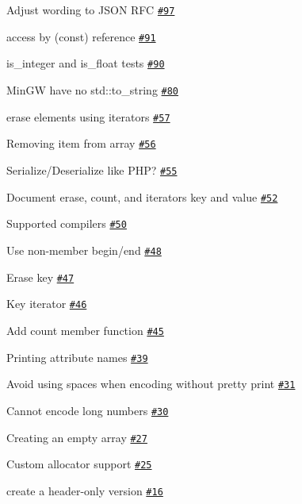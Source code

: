\begin{DoxyItemize}
\item Adjust wording to J\+S\+ON R\+FC \href{https://github.com/nlohmann/json/issues/97}{\tt \#97}
\item access by (const) reference \href{https://github.com/nlohmann/json/issues/91}{\tt \#91}
\item is\+\_\+integer and is\+\_\+float tests \href{https://github.com/nlohmann/json/issues/90}{\tt \#90}
\item Min\+GW have no std\+::to\+\_\+string \href{https://github.com/nlohmann/json/issues/80}{\tt \#80}
\item erase elements using iterators \href{https://github.com/nlohmann/json/issues/57}{\tt \#57}
\item Removing item from array \href{https://github.com/nlohmann/json/issues/56}{\tt \#56}
\item Serialize/\+Deserialize like P\+HP? \href{https://github.com/nlohmann/json/issues/55}{\tt \#55}
\item Document erase, count, and iterators key and value \href{https://github.com/nlohmann/json/issues/52}{\tt \#52}
\item Supported compilers \href{https://github.com/nlohmann/json/issues/50}{\tt \#50}
\item Use non-\/member begin/end \href{https://github.com/nlohmann/json/issues/48}{\tt \#48}
\item Erase key \href{https://github.com/nlohmann/json/issues/47}{\tt \#47}
\item Key iterator \href{https://github.com/nlohmann/json/issues/46}{\tt \#46}
\item Add count member function \href{https://github.com/nlohmann/json/issues/45}{\tt \#45}
\item Printing attribute names \href{https://github.com/nlohmann/json/issues/39}{\tt \#39}
\item Avoid using spaces when encoding without pretty print \href{https://github.com/nlohmann/json/issues/31}{\tt \#31}
\item Cannot encode long numbers \href{https://github.com/nlohmann/json/issues/30}{\tt \#30}
\item Creating an empty array \href{https://github.com/nlohmann/json/issues/27}{\tt \#27}
\item Custom allocator support \href{https://github.com/nlohmann/json/issues/25}{\tt \#25}
\item create a header-\/only version \href{https://github.com/nlohmann/json/issues/16}{\tt \#16}

\end{DoxyItemize}
